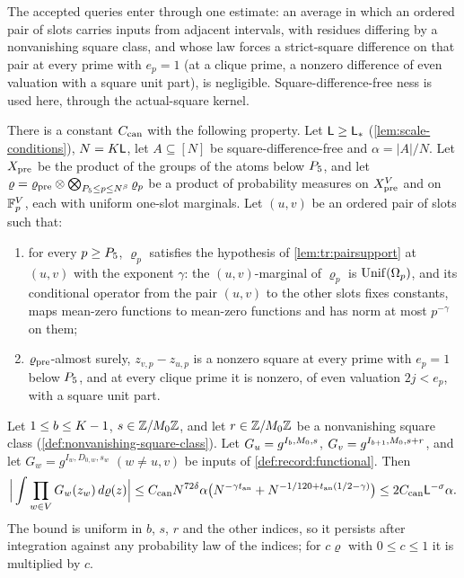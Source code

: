 The accepted queries enter through one estimate: an average in which an
ordered pair of slots carries inputs from adjacent intervals, with residues
differing by a nonvanishing square class, and whose law forces a strict-square
difference on that pair at every prime with $e_p=1$ (at a clique prime, a
nonzero difference of even valuation with a square unit part), is
negligible. Square-difference-free%
ness is used here, through the actual-square kernel.

\begin{lemma}
\label{lem:record:density-can}
There is a constant $C_{\rm can}$ with the following property. Let
$\mathsf L\ge\mathsf L_*$ (\cref{lem:scale-conditions}), $N=K\mathsf L$, let
$A\subseteq[N]$ be square-difference-free and $\alpha=|A|/N$. Let $X_{\rm pre}$
be the product of the groups of the atoms below $P_5$, and let
$\varrho=\varrho_{\rm pre}\otimes\bigotimes_{P_5\le p\le N^\beta}\varrho_p$
be a product of probability measures on $X_{\rm pre}^V$ and on $\mathbb F_p^V$, each
with uniform one-slot marginals. Let $(u,v)$ be an ordered pair of slots
such that:
\begin{enumerate}[label=(\alph*)]
\item for every $p\ge P_5$, $\varrho_p$ satisfies the hypothesis of
 \cref{lem:tr:pairsupport} at $(u,v)$ with the exponent $\gamma$: the
 $(u,v)$-marginal of $\varrho_p$ is $\operatorname{Unif}(\Omega_{p})$, and its conditional
 operator from the pair $(u,v)$ to the other slots fixes constants, maps
 mean-zero functions to mean-zero functions and has norm at most
 $p^{-\gamma}$ on them;
\item $\varrho_{\rm pre}$-almost surely, $z_{v,p}-z_{u,p}$ is a nonzero square
 at every prime with $e_p=1$ below $P_5$, and at every clique prime it is
 nonzero, of even valuation $2j<e_p$, with a square unit part.
\end{enumerate}
Let $1\le b\le K-1$, $s\in\mathbb Z/M_0\mathbb Z$, and let $r\in\mathbb Z/M_0\mathbb Z$ be a
nonvanishing square class (\cref{def:nonvanishing-square-class}). Let $G_u=g^{I_b,M_0,s}$,
$G_v=g^{I_{b+1},M_0,s+r}$, and let $G_w=g^{I_w,D_{0,w},s_w}$ $(w\ne u,v)$
be inputs of \cref{def:record:functional}. Then
\[
 \Big|\int\prod_{w\in V}G_w(z_w)\,d\varrho(z)\Big|\le C_{\rm can}N^{72\delta}\alpha
 \big(N^{-\gamma t_{\rm an}}+N^{-1/120+t_{\rm an}(1/2-\gamma)}\big)
 \le2C_{\rm can}\mathsf L^{-\sigma}\alpha .
\]
The bound is uniform in $b$, $s$, $r$ and the other indices, so it persists
after integration against any probability law of the indices; for
$c\varrho$ with $0\le c\le1$ it is multiplied by $c$.
\end{lemma}

